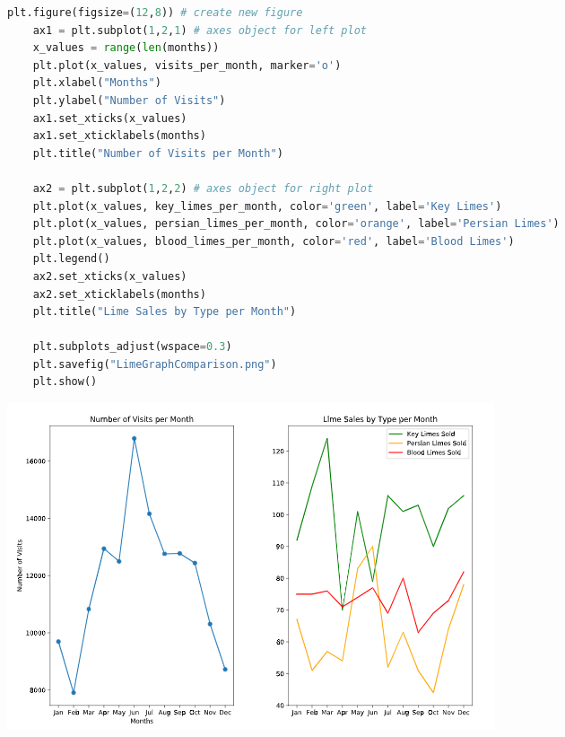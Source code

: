 \documentclass[11pt, a4paper]{article}
\begin{document}
\begin{spacing}{1.1}
\begin{lstlisting}[language=Python]
	plt.figure(figsize=(12,8)) # create new figure
	ax1 = plt.subplot(1,2,1) # axes object for left plot
	x_values = range(len(months))
	plt.plot(x_values, visits_per_month, marker='o')
	plt.xlabel("Months")
	plt.ylabel("Number of Visits")
	ax1.set_xticks(x_values)
	ax1.set_xticklabels(months)
	plt.title("Number of Visits per Month")
	
	ax2 = plt.subplot(1,2,2) # axes object for right plot
	plt.plot(x_values, key_limes_per_month, color='green', label='Key Limes')
	plt.plot(x_values, persian_limes_per_month, color='orange', label='Persian Limes')
	plt.plot(x_values, blood_limes_per_month, color='red', label='Blood Limes')
	plt.legend()
	ax2.set_xticks(x_values)
	ax2.set_xticklabels(months)
	plt.title("Lime Sales by Type per Month")
	
	plt.subplots_adjust(wspace=0.3)
	plt.savefig("LimeGraphComparison.png")
	plt.show() \end{lstlisting}\vspace*{1mm}
	\includegraphics[scale=.95]{lime} \newpage

\end{spacing}
\end{document}
